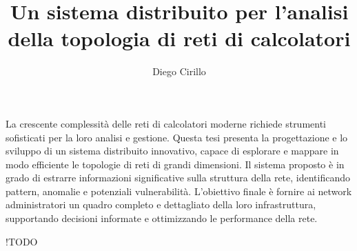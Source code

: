 \documentclass[target=bach,aauheader=,style=]{thud}
\title{Un sistema distribuito per l'analisi della topologia di reti di calcolatori}
\author{Diego Cirillo}
\begin{document}
\maketitle



\abstract
La crescente complessità delle reti di calcolatori moderne richiede strumenti sofisticati per la loro analisi e gestione. Questa tesi presenta la progettazione e lo sviluppo di un sistema distribuito innovativo, capace di esplorare e mappare in modo efficiente le topologie di reti di grandi dimensioni. Il sistema proposto è in grado di estrarre informazioni significative sulla struttura della rete, identificando pattern, anomalie e potenziali vulnerabilità. L'obiettivo finale è fornire ai network administratori un quadro completo e dettagliato della loro infrastruttura, supportando decisioni informate e ottimizzando le performance della rete.

\tableofcontents


\listoffigures
!TODO

\mainmatter


\end{document}
